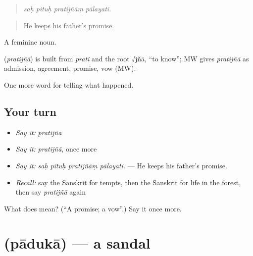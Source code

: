 \begin{quote}
   
\end{quote}

\begin{quote}
\emph{saḥ pituḥ pratijñāṃ pālayati.}
\end{quote}

\begin{quote}
He keeps his father's promise.
\end{quote}

A feminine noun.

\begin{cousinweb}
\textbf{} (\emph{pratijñā}) is built from \emph{prati} and the root √jñā, \textquotedblleft{}to know\textquotedblright{}; MW gives \emph{pratijñā} as admission, agreement, promise, vow (MW).
\end{cousinweb}

\begin{grammarlens}[title={What you've built}]
One more word for telling what happened.
\end{grammarlens}

\subsection*{Your turn}
\begin{itemize}
\raggedright
  \item \emph{Say it:} \emph{pratijñā}
  \item \emph{Say it:} \emph{pratijñā}, once more
  \item \emph{Say it:} \emph{saḥ pituḥ pratijñāṃ pālayati.} — He keeps his father's promise.
  \item \emph{Recall:} say the Sanskrit for tempts, then the Sanskrit for life in the forest, then say \emph{pratijñā} again
\end{itemize}

\begin{tcolorbox}[breakable,colback=teal!4,colframe=teal!35!black,title={Before you move on}]
What does  mean? (\textquotedblleft{}A promise; a vow\textquotedblright{}.) Say it once more.
\end{tcolorbox}
\section[\texorpdfstring{\sk{पादुका} (pādukā)}{पादुका (pādukā)}]{ (pādukā) — a sandal}

